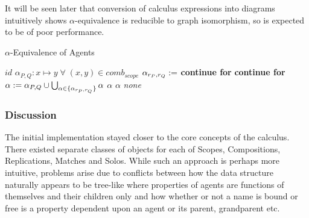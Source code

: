        It will be seen later that conversion of calculus expressions into diagrams intuitively shows $\alpha$-equivalence is reducible to graph isomorphism, so is expected to be of poor performance.
        \begin{breakablealgorithm}
            \caption{$\alpha$-Equivalence of Agents}
            \begin{algorithmic}[1]
                        \State\Return$id$
                    \EndIf
                        \State$\alpha_{P, Q} : x \mapsto y \; \forall \; (x, y) \in comb_{scope}$
                                \State$\alpha_{r_P, r_Q} :=$ 
                            \EndFor
                                \State\textbf{continue for}
                                \State\textbf{continue for}
                            \Else
                                \State$\alpha := \alpha_{P, Q} \cup \bigcup_{\alpha \in \{\alpha_{r_P, r_Q}\}} \alpha$
                            \EndIf
                                \State\Return$\alpha$
                            \EndIf
                        \EndFor
                            \State\Return$\alpha$
                        \EndIf
                    \EndFor
                    \State\Return\textit{none}
                \EndFunction
            \end{algorithmic}
        \end{breakablealgorithm}


    \subsubsection{Discussion}
        The initial implementation stayed closer to the core concepts of the calculus.
        There existed separate classes of objects for each of Scopes, Compositions, Replications, Matches and Solos.
        While such an approach is perhaps more intuitive, problems arise due to conflicts between how the data structure naturally appears to be tree-like where properties of agents are functions of themselves and their children only and how whether or not a name is bound or free is a property dependent upon an agent or its parent, grandparent etc.

